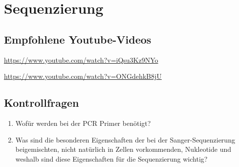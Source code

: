 \section{Sequenzierung}





\subsection{Empfohlene Youtube-Videos}
\begin{description}[align=left]
    \item [PCR] \href{https://www.youtube.com/watch?v=iQsu3Kz9NYo}{https://www.youtube.com/watch?v=iQsu3Kz9NYo}
    \item [Sanger-Sequenzierung] \href{https://www.youtube.com/watch?v=ONGdehkB8jU}{https://www.youtube.com/watch?v=ONGdehkB8jU}
\end{description}

\subsection{Kontrollfragen} 
\begin{enumerate}
	\item Wofür werden bei der PCR Primer benötigt?
	\item Was sind die besonderen Eigenschaften der bei der Sanger-Sequenzierung beigemischten, nicht natürlich in Zellen vorkommenden, Nukleotide und weshalb sind diese Eigenschaften für die Sequenzierung wichtig? 
\end{enumerate}
